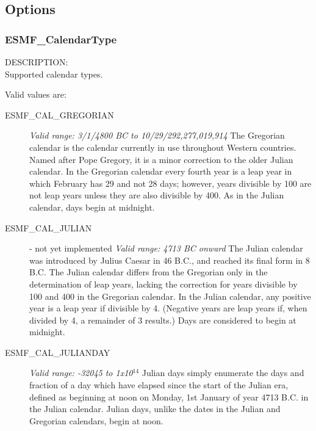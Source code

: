 
\subsection{Options}

\subsubsection{ESMF\_CalendarType}

{\sf DESCRIPTION:\\}
Supported calendar types.

Valid values are:
\begin{description}
      
\item [ESMF\_CAL\_GREGORIAN]  
{\it Valid range: 3/1/4800 BC to 10/29/292,277,019,914 } \newline
The Gregorian calendar is the calendar currently in use throughout Western
countries.  Named after Pope Gregory, it is a minor 
correction to the older Julian calendar. In the Gregorian calendar every
fourth year is a leap year in which February has 29 and not 28 days;
however, years divisible by 100 are not leap years unless they are also 
divisible  by 400.  As in the Julian calendar, days begin at midnight.

\item [ESMF\_CAL\_JULIAN] - not yet implemented
{\it Valid range: 4713 BC onward} \newline
The Julian calendar was introduced by Julius Caesar in 46 B.C., and 
reached its final form in 8 B.C.  The Julian calendar differs from the 
Gregorian only in the determination of leap years, lacking the correction 
for years divisible
by 100 and 400 in the Gregorian calendar. In the Julian calendar, any positive 
year is a leap year if divisible by 4. (Negative years are leap years if, when 
divided by 4, a remainder of 3 results.) Days are considered to begin at 
midnight.

\item [ESMF\_CAL\_JULIANDAY]
{\it Valid range: -32045 to 1x10$^{14}$} \newline
Julian days simply enumerate the days and fraction of a day which have elapsed 
since the start of the Julian era, defined as beginning at noon on Monday, 
1st January of year 4713 B.C. in the Julian calendar.  Julian days, 
unlike the dates in the Julian and Gregorian calendars, begin at noon.


\end{description}
